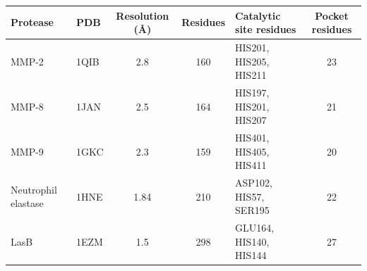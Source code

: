 \begin{tabular}{@{}llcclc@{}}\toprule
Protease & PDB & Resolution (\AA) & Residues & Catalytic site residues & Pocket residues \\\midrule
MMP-2 & 1QIB & 2.8 & 160 & HIS201, HIS205, HIS211 & 23 \\
MMP-8 & 1JAN & 2.5 & 164 & HIS197, HIS201, HIS207 & 21 \\
MMP-9 & 1GKC & 2.3 & 159 & HIS401, HIS405, HIS411 & 20 \\
Neutrophil elastase & 1HNE & 1.84 & 210 & ASP102, HIS57, SER195 & 22 \\
LasB & 1EZM & 1.5 & 298 & GLU164, HIS140, HIS144 & 27 \\
\bottomrule\end{tabular}

